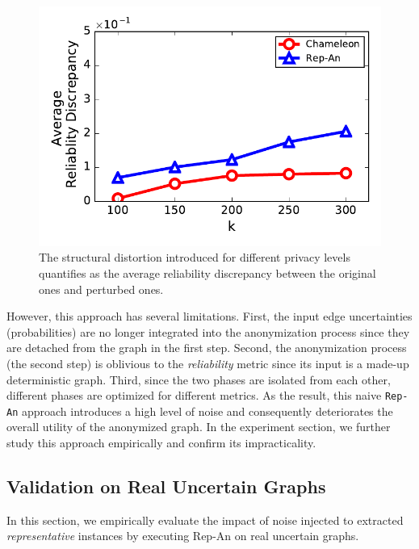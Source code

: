 \begin{figure}[!htb]
{\begin{minipage}[l]{0.62\columnwidth}
        \includegraphics[width=1\linewidth]{rep_exp/ppi_rel.pdf}
      \end{minipage}
      }

    \vspace{-10pt}
    \caption{The structural distortion introduced for different privacy levels quantifies as the average reliability discrepancy between the original ones and perturbed ones.}
    \label{fig:rep_exp}
    \vspace{-5pt}
\end{figure}




However, this approach has several limitations. First, the input edge uncertainties (probabilities) are no longer integrated into the anonymization process since they are detached from the graph in the first step. Second, the anonymization process (the second step) is oblivious to the {\em reliability} metric since its input is a made-up deterministic graph. Third, since the two phases are isolated from each other, different phases are optimized for different metrics. As the result, this naive \texttt{Rep-An} approach introduces a high level of noise and consequently deteriorates the overall utility of the anonymized graph. 
In the experiment section, we further study this approach empirically and confirm its impracticality.


\subsection{Validation on Real Uncertain Graphs}
In this section, we empirically evaluate the impact of noise injected to extracted \emph{representative} instances by executing Rep-An on real uncertain graphs.

